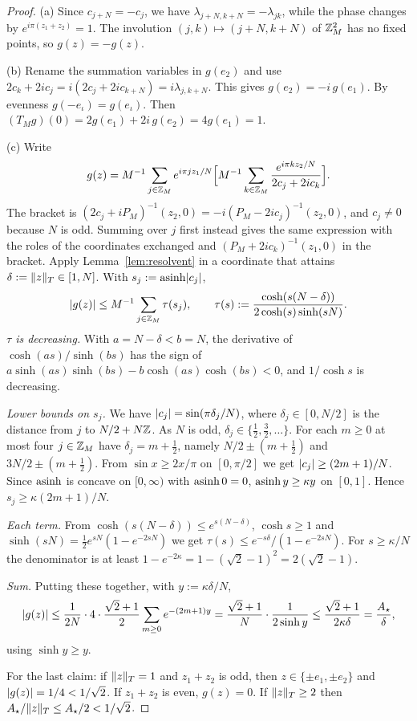 \begin{proof}
(a) Since $c_{j+N}=-c_j$, we have $\lambda_{j+N,k+N}=-\lambda_{jk}$, while the phase changes by $e^{i\pi(z_1+z_2)}=1$. The involution $(j,k)\mapsto(j+N,k+N)$ of $\mathbb{Z}_M^2$ has no fixed points, so $g(z)=-g(z)$.

(b) Rename the summation variables in $g(e_2)$ and use $2c_k+2ic_j=i(2c_j+2ic_{k+N})=i\lambda_{j,k+N}$. This gives $g(e_2)=-i\,g(e_1)$. By evenness $g(-e_\iota)=g(e_\iota)$. Then $(T_Mg)(0)=2g(e_1)+2i\,g(e_2)=4g(e_1)=1$.

(c) Write
\[
  g(z)=M^{-1}\sum_{j\in\mathbb{Z}_M}e^{i\pi jz_1/N}\Bigl[M^{-1}\sum_{k\in\mathbb{Z}_M}\frac{e^{i\pi kz_2/N}}{2c_j+2ic_k}\Bigr].
\]
The bracket is $(2c_j+iP_M)^{-1}(z_2,0)=-i(P_M-2ic_j)^{-1}(z_2,0)$, and $c_j\ne0$ because $N$ is odd. Summing over $j$ first instead gives the same expression with the roles of the coordinates exchanged and $(P_M+2ic_k)^{-1}(z_1,0)$ in the bracket. Apply Lemma~\ref{lem:resolvent} in a coordinate that attains $\delta:=\lVert z\rVert_T\in[1,N]$. With $s_j:=\operatorname{asinh}\lvert c_j\rvert$,
\[
  \lvert g(z)\rvert\le M^{-1}\sum_{j\in\mathbb{Z}_M}\tau(s_j),\qquad \tau(s):=\frac{\cosh(s(N-\delta))}{2\cosh(s)\sinh(sN)} .
\]
\emph{$\tau$ is decreasing.} With $a=N-\delta<b=N$, the derivative of $\cosh(as)/\sinh(bs)$ has the sign of $a\sinh(as)\sinh(bs)-b\cosh(as)\cosh(bs)<0$, and $1/\cosh s$ is decreasing.

\emph{Lower bounds on $s_j$.} We have $\lvert c_j\rvert=\sin(\pi\delta_j/N)$, where $\delta_j\in[0,N/2]$ is the distance from $j$ to $N/2+N\mathbb{Z}$. As $N$ is odd, $\delta_j\in\{\frac12,\frac32,\dots\}$. For each $m\ge0$ at most four $j\in\mathbb{Z}_M$ have $\delta_j=m+\frac12$, namely $N/2\pm(m+\frac12)$ and $3N/2\pm(m+\frac12)$. From $\sin x\ge2x/\pi$ on $[0,\pi/2]$ we get $\lvert c_j\rvert\ge(2m+1)/N$. Since $\operatorname{asinh}$ is concave on $[0,\infty)$ with $\operatorname{asinh}0=0$, $\operatorname{asinh} y\ge\kappa y$ on $[0,1]$. Hence $s_j\ge\kappa(2m+1)/N$.

\emph{Each term.} From $\cosh(s(N-\delta))\le e^{s(N-\delta)}$, $\cosh s\ge1$ and $\sinh(sN)=\frac12e^{sN}(1-e^{-2sN})$ we get $\tau(s)\le e^{-s\delta}/(1-e^{-2sN})$. For $s\ge\kappa/N$ the denominator is at least $1-e^{-2\kappa}=1-(\sqrt2-1)^2=2(\sqrt2-1)$.

\emph{Sum.} Putting these together, with $y:=\kappa\delta/N$,
\[
  \lvert g(z)\rvert\le\frac1{2N}\cdot4\cdot\frac{\sqrt2+1}{2}\sum_{m\ge0}e^{-(2m+1)y}=\frac{\sqrt2+1}{N}\cdot\frac{1}{2\sinh y}\le\frac{\sqrt2+1}{2\kappa\delta}=\frac{A_\star}{\delta},
\]
using $\sinh y\ge y$.

For the last claim: if $\lVert z\rVert_T=1$ and $z_1+z_2$ is odd, then $z\in\{\pm e_1,\pm e_2\}$ and $\lvert g(z)\rvert=1/4<1/\sqrt2$. If $z_1+z_2$ is even, $g(z)=0$. If $\lVert z\rVert_T\ge2$ then $A_\star/\lVert z\rVert_T\le A_\star/2<1/\sqrt2$.
\end{proof}

